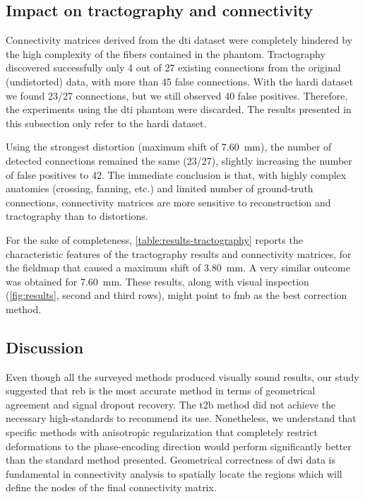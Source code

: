 \subsection{Impact on tractography and connectivity}

Connectivity matrices derived from the \gls*{dti} dataset
were completely hindered by the high complexity of the 
fibers contained
in the phantom. Tractography discovered successfully only 4 out 
of 27 existing connections from the original (undistorted) data,
with more than 45 false connections.
With the \gls*{hardi} dataset we found 23/27 connections,
but we still observed 40 false positives. Therefore, the 
experiments using the \gls*{dti} phantom were discarded. The
results presented in this subsection only refer to the 
\gls*{hardi} dataset.

Using the strongest distortion (maximum shift of 7.60~mm),
the number of detected connections
remained the same (23/27), slightly increasing the number of
false positives to 42. The immediate conclusion is that, with highly
complex anatomies (crossing, fanning, etc.) and limited number of
ground-truth connections, connectivity matrices are more sensitive 
to reconstruction and tractography than to distortions.

For the sake of completeness, \autoref{table:results-tractography}
reports the characteristic features of the tractography results
and connectivity matrices, for the fieldmap that caused a maximum
shift of 3.80~mm. A very similar outcome was obtained for
7.60~mm. These results, along with visual inspection
(\autoref{fig:results}, second and third rows), might point
to \gls*{fmb} as the best correction method.


\subsection{Discussion}

Even though all the surveyed methods produced visually 
sound results, our study suggested that \gls*{reb} is the 
most accurate method in terms of geometrical agreement and
signal dropout recovery. 
The \gls*{t2b} method did not achieve the necessary high-standards
to recommend its use. Nonetheless, we understand that specific
methods with anisotropic regularization that completely
restrict deformations to the phase-encoding direction would perform
significantly better than the standard method presented.
Geometrical correctness of \gls*{dwi} data is fundamental 
in connectivity analysis to spatially locate the
regions which will define the nodes of the final connectivity
matrix.

